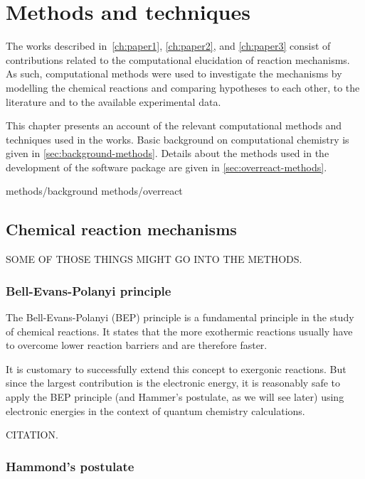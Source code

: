 \chapter{Methods and techniques}%
\label{ch:methods}

The works described in~\autoref{ch:paper1}, \autoref{ch:paper2}, and
\autoref{ch:paper3} consist of contributions related to the computational
elucidation of reaction mechanisms.
As such, computational methods were used to investigate the mechanisms by
modelling the chemical reactions and comparing hypotheses to each other,
to the literature and to the available experimental data.

This chapter presents an account of the relevant computational methods and
techniques used in the works.
Basic background on computational chemistry is given in
\autoref{sec:background-methods}.
Details about the methods used in the development of the \overreact{} software
package are given in \autoref{sec:overreact-methods}.

{methods/background}
{methods/overreact}

\section{Chemical reaction mechanisms}

SOME OF THOSE THINGS MIGHT GO INTO THE METHODS.\@

\subsection{Bell-Evans-Polanyi principle}

The Bell-Evans-Polanyi (BEP) principle is a fundamental principle in the study
of chemical reactions.
It states that the more exothermic reactions usually have to overcome lower
reaction barriers and are therefore faster.

It is customary to successfully extend this concept to exergonic reactions.
But since the largest contribution is the electronic energy, it is reasonably
safe to apply the BEP principle (and Hammer's postulate, as we will see later)
using electronic energies in the context of quantum chemistry calculations.

CITATION.\@

\subsection{Hammond's postulate}

